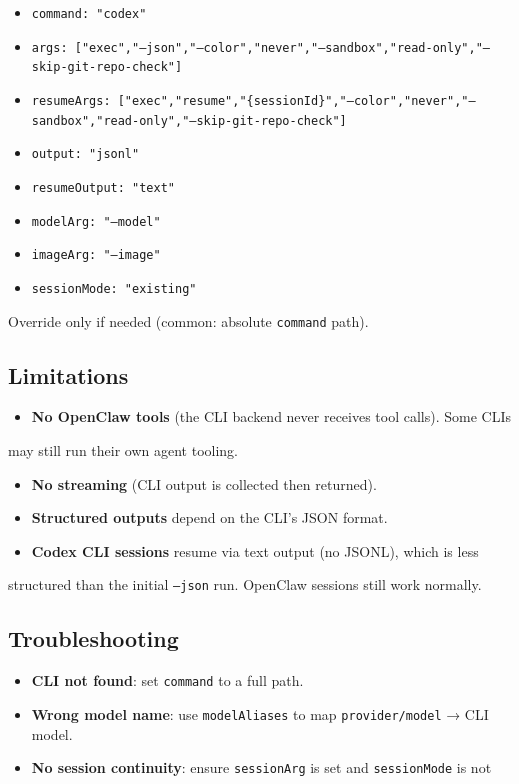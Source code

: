 \begin{itemize}
  \item \texttt{command: "codex"}
  \item \texttt{args: ["exec","--json","--color","never","--sandbox","read-only","--skip-git-repo-check"]}
  \item \texttt{resumeArgs: ["exec","resume","\{sessionId\}","--color","never","--sandbox","read-only","--skip-git-repo-check"]}
  \item \texttt{output: "jsonl"}
  \item \texttt{resumeOutput: "text"}
  \item \texttt{modelArg: "--model"}
  \item \texttt{imageArg: "--image"}
  \item \texttt{sessionMode: "existing"}
\end{itemize}


Override only if needed (common: absolute \texttt{command} path).

\subsection{Limitations}


\begin{itemize}
  \item \textbf{No OpenClaw tools} (the CLI backend never receives tool calls). Some CLIs
\end{itemize}

may still run their own agent tooling.
\begin{itemize}
  \item \textbf{No streaming} (CLI output is collected then returned).
  \item \textbf{Structured outputs} depend on the CLI’s JSON format.
  \item \textbf{Codex CLI sessions} resume via text output (no JSONL), which is less
\end{itemize}

structured than the initial \texttt{--json} run. OpenClaw sessions still work
normally.

\subsection{Troubleshooting}


\begin{itemize}
  \item \textbf{CLI not found}: set \texttt{command} to a full path.
  \item \textbf{Wrong model name}: use \texttt{modelAliases} to map \texttt{provider/model} → CLI model.
  \item \textbf{No session continuity}: ensure \texttt{sessionArg} is set and \texttt{sessionMode} is not
\end{itemize}

